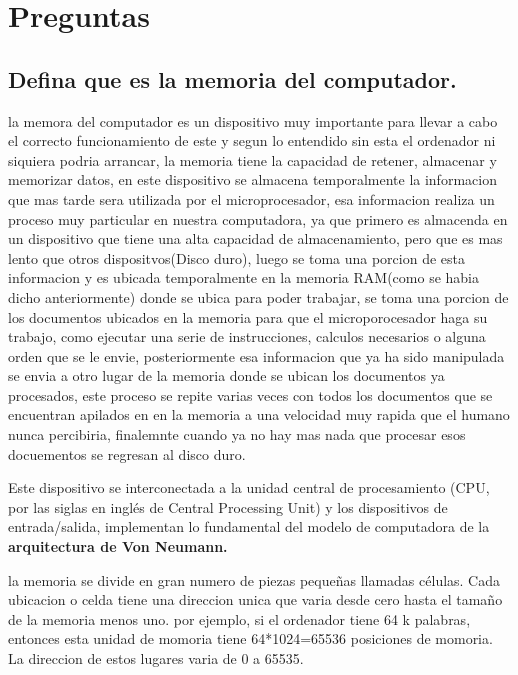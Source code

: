 \documentclass{article}
\begin{document}
\section{Preguntas} \label{contenido}

\subsection{Defina que es la memoria del computador.}
\noindent
la memora del computador es un dispositivo muy importante para llevar a cabo el correcto funcionamiento de este y segun lo entendido sin esta el ordenador ni siquiera podria arrancar, la memoria tiene la capacidad de retener, almacenar y memorizar datos, en este dispositivo se almacena temporalmente la informacion que mas tarde sera utilizada por el microprocesador, esa informacion realiza un proceso muy particular en nuestra computadora, ya que primero es almacenda en un dispositivo que tiene una alta capacidad de almacenamiento, pero que es mas lento que otros dispositvos(Disco duro), luego se toma una porcion de esta informacion y es ubicada temporalmente en la memoria RAM(como se habia dicho anteriormente) donde se ubica para poder trabajar, se toma una porcion de los documentos ubicados en la memoria para que el microporocesador haga su trabajo, como ejecutar una serie de instrucciones, calculos necesarios o alguna orden que se le envie, posteriormente esa informacion que ya ha sido manipulada se envia a otro lugar de la memoria donde se ubican los documentos ya procesados, este proceso se repite varias veces con todos los documentos que se encuentran apilados en en la memoria a una velocidad muy rapida que el humano nunca percibiria, finalemnte cuando ya no hay mas nada que procesar esos docuementos se regresan al disco duro. 

\vspace{0.5cm}
\noindent
Este dispositivo se interconectada a la unidad central de procesamiento (CPU, por las siglas en inglés de Central Processing Unit) y los dispositivos de entrada/salida, implementan lo fundamental del modelo de computadora de la \textbf{arquitectura de Von Neumann.}\cite{geniolandia}

\vspace{0.5cm}
\noindent
la memoria se divide en gran numero de piezas pequeñas llamadas células. Cada ubicacion o celda tiene una direccion unica que varia desde cero hasta el tamaño de la memoria menos uno. por ejemplo, si el ordenador tiene 64 k palabras, entonces esta unidad de momoria tiene 64*1024=65536 posiciones de momoria. La direccion de estos lugares varia de 0 a 65535. \cite{tutorialspoint}
\end{document}
